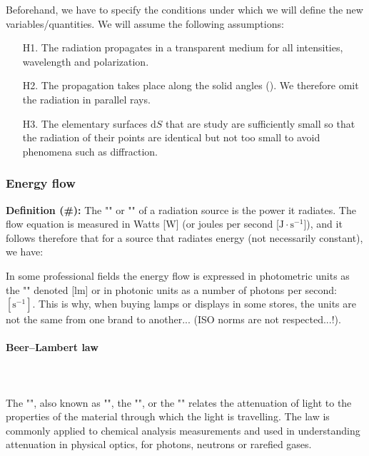 	Beforehand, we have to specify the conditions under which we will define the new variables/quantities. We will assume the following assumptions:
	\begin{enumerate}
		\item[H1.] The radiation propagates in a transparent medium for all intensities, wavelength and polarization.
		
		\item[H2.] The propagation takes place along the solid angles (). We therefore omit the radiation in parallel rays.
		
		\item[H3.] The elementary surfaces $\mathrm{d}S$ that are study are sufficiently small so that the radiation of their points are identical but not too small to avoid phenomena such as diffraction.
	\end{enumerate}
	
	\subsubsection{Energy flow} 
	\textbf{Definition (\#\mydef):} The "" or "\label{radiant flow}" of a radiation source is the power it radiates. The flow equation is measured in Watts [W] (or joules per second [$\text{J}\cdot \text{s}^{-1}$]), and it follows therefore that for a source that radiates energy (not necessarily constant), we have:
	
	In some professional fields the energy flow is expressed in photometric units as the "" denoted [lm] or in photonic units as a number of photons per second: $[\text{s}^{-1}]$. This is why, when buying lamps or displays in some stores, the units are not the same from one brand to another... (ISO norms are not respected...!).
	
	\paragraph{Beer–Lambert law}\label{Beer-Lambert law}\mbox{}\\\\
	The "", also known as "", the "", or the "" relates the attenuation of light to the properties of the material through which the light is travelling. The law is commonly applied to chemical analysis measurements and used in understanding attenuation in physical optics, for photons, neutrons or rarefied gases.
	
